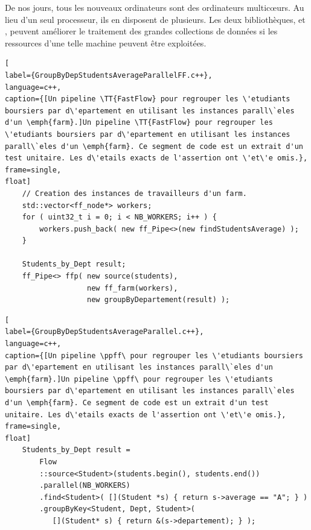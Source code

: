 De nos jours, tous les nouveaux ordinateurs sont des ordinateurs multicœurs. Au lieu d'un seul processeur, ils en disposent de plusieurs. Les deux biblioth\`eques,  et , peuvent am\'eliorer le traitement des grandes collections de donn\'ees si les ressources d'une telle machine peuvent être exploitées. 

\begin{lstlisting}[
label={GroupByDepStudentsAverageParallelFF.c++},
language=c++,
caption={[Un pipeline \TT{FastFlow} pour regrouper les \'etudiants boursiers par d\'epartement en utilisant les instances parall\`eles d'un \emph{farm}.]Un pipeline \TT{FastFlow} pour regrouper les \'etudiants boursiers par d\'epartement en utilisant les instances parall\`eles d'un \emph{farm}. Ce segment de code est un extrait d'un test unitaire. Les d\'etails exacts de l'assertion ont \'et\'e omis.},
frame=single,
float]
	// Creation des instances de travailleurs d'un farm.
	std::vector<ff_node*> workers;
	for ( uint32_t i = 0; i < NB_WORKERS; i++ ) {
		workers.push_back( new ff_Pipe<>(new findStudentsAverage) );
	}

	Students_by_Dept result;
	ff_Pipe<> ffp( new source(students),
				   new ff_farm(workers),
				   new groupByDepartement(result) );     
\end{lstlisting}

\begin{lstlisting}[
label={GroupByDepStudentsAverageParallel.c++},
language=c++,
caption={[Un pipeline \ppff\ pour regrouper les \'etudiants boursiers par d\'epartement en utilisant les instances parall\`eles d'un \emph{farm}.]Un pipeline \ppff\ pour regrouper les \'etudiants boursiers par d\'epartement en utilisant les instances parall\`eles d'un \emph{farm}. Ce segment de code est un extrait d'un test unitaire. Les d\'etails exacts de l'assertion ont \'et\'e omis.},
frame=single,
float]
    Students_by_Dept result = 
        Flow
        ::source<Student>(students.begin(), students.end())
        .parallel(NB_WORKERS)
        .find<Student>( [](Student *s) { return s->average == "A"; } )
        .groupByKey<Student, Dept, Student>(
           [](Student* s) { return &(s->departement); } );
\end{lstlisting}

